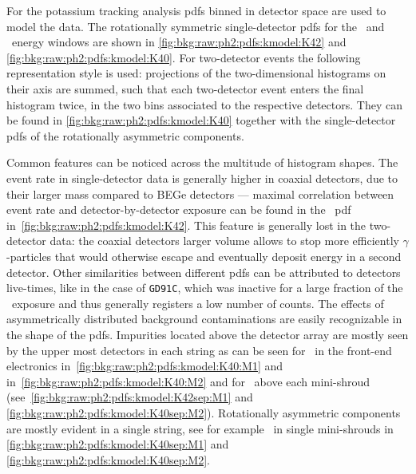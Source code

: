 For the potassium tracking analysis pdfs binned in detector space are
used to model the data. The rotationally symmetric single-detector pdfs
for the \kvn\ and \kvz\ energy windows are shown in
\cref{fig:bkg:raw:ph2:pdfs:kmodel:K42} and
\cref{fig:bkg:raw:ph2:pdfs:kmodel:K40}.  For two-detector events the
following representation style is used:
projections of the two-dimensional histograms on their axis are summed,
such that each two-detector event enters the final histogram twice, in
the two bins associated to the respective detectors. They can be found
in \cref{fig:bkg:raw:ph2:pdfs:kmodel:K40} together with the single-detector
pdfs of the rotationally asymmetric components. 

Common features can be noticed across the multitude of histogram shapes.
The event rate in single-detector data is generally higher in coaxial
detectors, due to their larger mass compared to BEGe detectors ---
maximal correlation between event rate and detector-by-detector exposure
can be found in the \nnbb\ pdf in~\cref{fig:bkg:raw:ph2:pdfs:kmodel:K42}. This
feature is generally lost in the two-detector data: the coaxial
detectors larger volume allows to stop more efficiently
$\gamma$-particles that would otherwise escape and eventually deposit
energy in a second detector. Other similarities between different pdfs
can be attributed to detectors live-times, like in the case of
\texttt{GD91C}, which was inactive for a large fraction of the
\phasetwo\ exposure and thus generally registers a low number of counts.
The effects of asymmetrically distributed background contaminations are
easily recognizable in the shape of the pdfs.  Impurities located above
the detector array are mostly seen by the upper most detectors in each
string as can be seen for \kvn\ in the front-end electronics
in~\cref{fig:bkg:raw:ph2:pdfs:kmodel:K40:M1} and
in~\cref{fig:bkg:raw:ph2:pdfs:kmodel:K40:M2} and for \kvz\ above each
mini-shroud (see~\cref{fig:bkg:raw:ph2:pdfs:kmodel:K42sep:M1} and
\cref{fig:bkg:raw:ph2:pdfs:kmodel:K40sep:M2}). Rotationally asymmetric
components are mostly evident in a single string, see for example \kvn\
in single mini-shrouds in \cref{fig:bkg:raw:ph2:pdfs:kmodel:K40sep:M1} and
\cref{fig:bkg:raw:ph2:pdfs:kmodel:K40sep:M2}.

